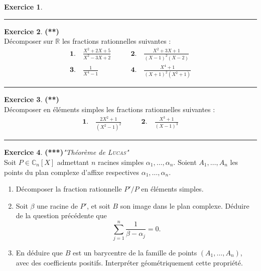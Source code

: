 \documentclass[a4paper,11pt]{article}
\theoremstyle{definition}
\newtheorem{exo}{Exercice} %
\begin{document}
\begin{minipage}{1\linewidth}
\begin{minipage}[t]{0.48\linewidth}
\begin{exo}
			
			\centering
			\rule{1\linewidth}{0.6pt}
		\end{exo}
		
			\begin{exo}\textbf{(**)}\quad\\[0.2cm]
			Décomposer sur $\mathbb R$ les fractions rationnelles suivantes :
			$$\begin{array}{ll}
			\displaystyle\mathbf{1.}\quad\frac{X^2+2X +5}{X^2-3X+2}&\quad\quad\mathbf{2.}\quad \displaystyle\frac{X^2+3X+1}{(X-1)^2(X-2)}\\[0.8cm]
			\mathbf{3.}\quad \displaystyle \frac 1{X^4-1}&\quad\quad \mathbf{4.}\quad \displaystyle\frac{X^4+1}{(X+1)^2(X^2+1)}
			\end{array}$$
			\centering
			\rule{1\linewidth}{0.6pt}
		\end{exo}
		
		
	\end{minipage}	
	\hfill\vrule\hfill
	\begin{minipage}[t]{0.48\linewidth}
		\raggedright
		
		\begin{exo}\textbf{(**)}\quad\\[0.2cm]
			Décomposer en éléments simples les fractions rationnelles suivantes : 
			$$\begin{array}{lll}
			\displaystyle\mathbf{1.}\quad\frac{2X^2+1}{(X^2-1)^2}&
			\quad\quad\mathbf{2.}\quad\displaystyle\frac{X^3+1}{(X-1)^3}
			\end{array}$$
			\centering
			\rule{1\linewidth}{0.6pt}
		\end{exo}
		
		

		
		\begin{exo}\textbf{(***)}\quad \textit{"Théorème de \textsc{Lucas}"}\\[0.2cm]
			Soit $P\in\mathbb C_n[X]$ admettant $n$ racines simples $\alpha_1,\dots,\alpha_n$.
			Soient $A_1,\dots,A_n$ les points du plan complexe d'affixe respectives $\alpha_1,\dots,\alpha_n$.
			\begin{enumerate}
				\item Décomposer la fraction rationnelle $P'/P$ en éléments simples.
				\item Soit $\beta$ une racine de $P'$, et soit $B$ son image dans le plan complexe. Déduire de la question précédente que 
				$$\sum_{j=1}^n \frac{1}{\beta-\alpha_j}=0.$$
				\item En déduire que $B$ est un barycentre de la famille de points $(A_1,\dots,A_n)$, avec des coefficients positifs.
				Interpréter géométriquement cette propriété.
			\end{enumerate}
			

\end{exo}
\end{minipage}
\end{minipage}
\end{document}
